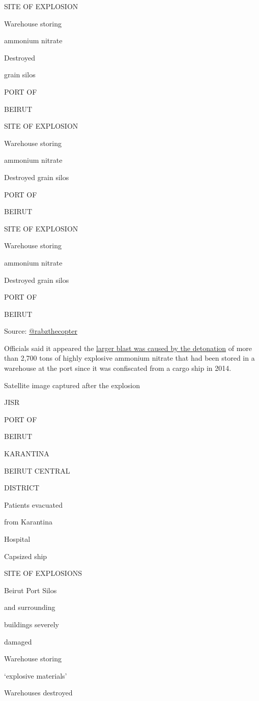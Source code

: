 SITE OF EXPLOSION

Warehouse storing

ammonium nitrate

Destroyed

grain silos

PORT OF

BEIRUT

SITE OF EXPLOSION

Warehouse storing

ammonium nitrate

Destroyed grain silos

PORT OF

BEIRUT

SITE OF EXPLOSION

Warehouse storing

ammonium nitrate

Destroyed grain silos

PORT OF

BEIRUT

Source: \href{https://www.instagram.com/rabzthecopter/}{@rabzthecopter}

Officials said it appeared the
\href{https://www.nytimes3xbfgragh.onion/2020/08/05/world/middleeast/beirut-explosion-what-happened.html}{larger
blast was caused by the detonation} of more than 2,700 tons of highly
explosive ammonium nitrate that had been stored in a warehouse at the
port since it was confiscated from a cargo ship in 2014.

Satellite image captured after the explosion

JISR

PORT OF

BEIRUT

KARANTINA

BEIRUT CENTRAL

DISTRICT

Patients evacuated

from Karantina

Hospital

Capsized ship

SITE OF EXPLOSIONS

Beirut Port Silos

and surrounding

buildings severely

damaged

Warehouse storing

`explosive materials'

Warehouses destroyed

